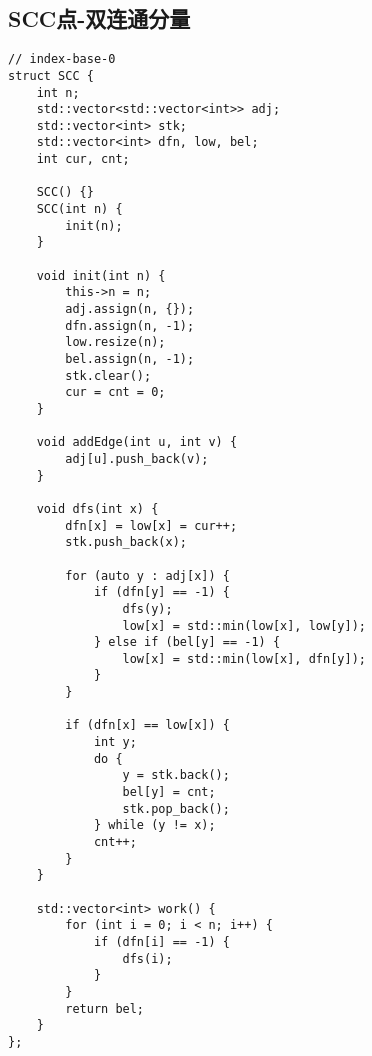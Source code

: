 \subsection{SCC点-双连通分量}
\begin{lstlisting}
// index-base-0
struct SCC {
    int n;
    std::vector<std::vector<int>> adj;
    std::vector<int> stk;
    std::vector<int> dfn, low, bel;
    int cur, cnt;
    
    SCC() {}
    SCC(int n) {
        init(n);
    }
    
    void init(int n) {
        this->n = n;
        adj.assign(n, {});
        dfn.assign(n, -1);
        low.resize(n);
        bel.assign(n, -1);
        stk.clear();
        cur = cnt = 0;
    }
    
    void addEdge(int u, int v) {
        adj[u].push_back(v);
    }
    
    void dfs(int x) {
        dfn[x] = low[x] = cur++;
        stk.push_back(x);
        
        for (auto y : adj[x]) {
            if (dfn[y] == -1) {
                dfs(y);
                low[x] = std::min(low[x], low[y]);
            } else if (bel[y] == -1) {
                low[x] = std::min(low[x], dfn[y]);
            }
        }
        
        if (dfn[x] == low[x]) {
            int y;
            do {
                y = stk.back();
                bel[y] = cnt;
                stk.pop_back();
            } while (y != x);
            cnt++;
        }
    }
    
    std::vector<int> work() {
        for (int i = 0; i < n; i++) {
            if (dfn[i] == -1) {
                dfs(i);
            }
        }
        return bel;
    }
};
\end{lstlisting}


